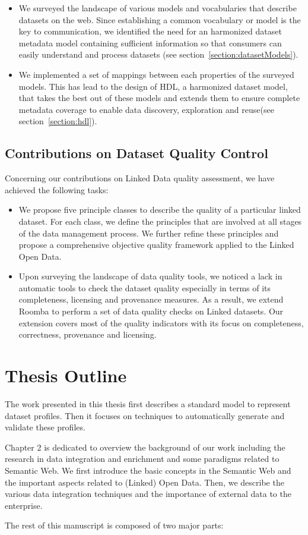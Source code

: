\begin{itemize}
	\item We surveyed the landscape of various models and vocabularies that describe datasets on the web. Since establishing a common vocabulary or model is the key to communication, we identified the need for an harmonized dataset metadata model containing sufficient information so that consumers can easily understand and process datasets (see section~\ref{section:datasetModels}).
	\item We implemented a set of mappings between each properties of the surveyed models. This has lead to the design of HDL, a harmonized dataset model, that takes the best out of these models and extends them to ensure complete metadata coverage to enable data discovery, exploration and reuse(see section~\ref{section:hdl}).
\end{itemize}

\subsection{Contributions on Dataset Quality Control}
Concerning our contributions on Linked Data quality assessment, we have achieved the following tasks:
\begin{itemize}
	\item We propose five principle classes to describe the quality of a particular linked dataset. For each class, we define the principles that are involved at all stages of the data management process. We further refine these principles and propose a comprehensive objective quality framework applied to the Linked Open Data.
	\item Upon surveying the landscape of data quality tools, we noticed a lack in automatic tools to check the dataset quality especially in terms of its completeness, licensing and provenance measures. As a result, we extend Roomba to perform a set of data quality checks on Linked datasets. Our extension covers most of the quality indicators with its focus on completeness, correctness, provenance and licensing.
\end{itemize}

\section{Thesis Outline} \label{sec:outline}
The work presented in this thesis first describes a standard model to represent dataset profiles. Then it focuses on techniques to automatically generate and validate these profiles.

Chapter 2 is dedicated to overview the background of our work including the research in data integration and enrichment and some paradigms related to Semantic Web. We first introduce the basic concepts in the Semantic Web and the important aspects related to (Linked) Open Data. Then, we describe the various data integration techniques and the importance of external data to the enterprise.~

The rest of this manuscript is composed of two major parts:

